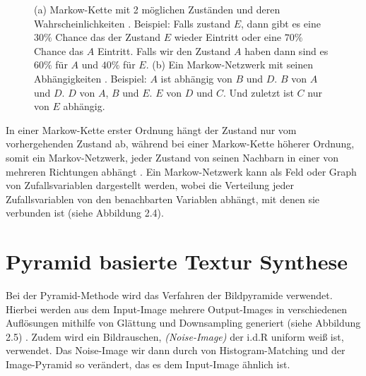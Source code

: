 \documentclass[12pt, a4paper,twoside,openany]{report} %
\begin{document}
\begin{figure}[H]
    \centering
    \qquad
    \caption{(a) Markow-Kette mit 2 möglichen Zuständen und deren Wahrscheinlichkeiten \cite{wiki:Markow-Kette}.
    Beispiel: Falls zustand $E$, dann gibt es eine $30\%$ Chance das der Zustand $E$ wieder Eintritt oder eine $70\%$ Chance das $A$ Eintritt.
    Falls wir den Zustand $A$ haben dann sind es $60\%$ für $A$ und $40\%$ für $E$. (b) Ein Markow-Netzwerk mit seinen Abhängigkeiten \cite{wiki:Markov_model}.
    Beispiel: $A$ ist abhängig von $B$ und $D$. $B$ von $A$ und $D$. $D$ von $A$, $B$ und $E$. $E$ von $D$ und $C$. Und zuletzt ist $C$ nur von $E$ abhängig.}%
\end{figure}

In einer Markow-Kette erster Ordnung hängt der Zustand nur vom vorhergehenden Zustand ab,
während bei einer Markow-Kette höherer Ordnung, somit ein Markov-Netzwerk, jeder Zustand von seinen Nachbarn in einer von mehreren Richtungen abhängt \cite{wiki:Markov_model}.
Ein Markow-Netzwerk kann als Feld oder Graph von Zufallsvariablen dargestellt werden,
wobei die Verteilung jeder Zufallsvariablen von den benachbarten Variablen abhängt, mit denen sie verbunden ist {(siehe Abbildung 2.4)}.

\section{Pyramid basierte Textur Synthese}

Bei der Pyramid-Methode wird das Verfahren der Bildpyramide verwendet.
Hierbei werden aus dem Input-Image mehrere Output-Images in verschiedenen Auflösungen mithilfe von Glättung und Downsampling generiert {(siehe Abbildung 2.5)} \cite{Heeger}.
\newline
Zudem wird ein Bildrauschen, \textit{(Noise-Image)} der i.d.R uniform weiß ist, verwendet.
Das Noise-Image wir dann durch von Histogram-Matching und der Image-Pyramid so verändert, das es dem Input-Image ähnlich ist.
\end{document}
